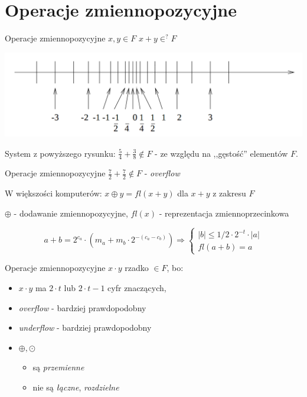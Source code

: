 \section{Operacje zmiennopozycyjne}
\begin{frame}{Operacje zmiennopozycyjne}
    $x, y \in F$ \newline
    $x + y \in^? F$

    \begin{center}
    \includegraphics[width=0.8\linewidth]{img/2/2_1_axis}
    \end{center}
    System z powyższego rysunku: $\frac{5}{4} + \frac{3}{8} \notin F$ - ze względu na ,,gęstość'' elementów $F$.
\end{frame}
\begin{frame}{Operacje zmiennopozycyjne}
    $\frac{7}{2} + \frac{7}{2} \notin F$ - {\it overflow}
    \vspace{.5cm}

    W większości komputerów: $x \oplus y = fl(x + y)$ dla $x + y$ z zakresu $F$

    $\oplus$ - dodawanie zmiennopozycyjne, \newline
    $fl(x)$ - reprezentacja zmiennoprzecinkowa 

    \[
    a + b = 2^{c_a} \cdot \left( m_a + m_b \cdot 2^{-(c_a-c_b)} \right) \Rightarrow
    \left\{ 
        \begin{array}{ll}
            |b| \le 1/2 \cdot 2^{-t} \cdot |a| \\
            fl(a + b) = a
        \end{array}
    \right.
    \]
\end{frame}
\begin{frame}{Operacje zmiennopozycyjne}
    $x \cdot y$ rzadko $\in F$, bo:
    \begin{itemize}
    \item $x \cdot y$ ma $2 \cdot t$ lub $2 \cdot t - 1$ cyfr znaczących,
    \item {\it overflow} - bardziej prawdopodobny
    \item {\it underflow} - bardziej prawdopodobny
    \item $\oplus, \odot$
        \begin{itemize}
        \item są {\it przemienne}
        \item nie są {\it łączne}, {\it rozdzielne}
        \end{itemize}
    \end{itemize}
\end{frame}
